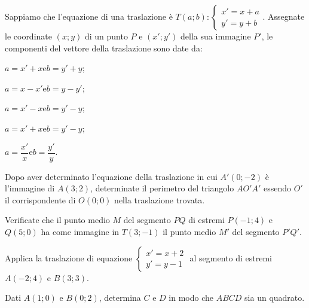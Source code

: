 \begin{esercizio}
	\label{ese:8.50} %
	Sappiamo che l'equazione di una traslazione è 
	$T(a;b):\begin{cases}x'=x+a\\y'=y+b\end{cases}$. Assegnate le 
	coordinate $(x;y)$ di un punto $P$ e $(x';y')$ della sua immagine 
	$P'$, le componenti del vettore della traslazione sono date da:
	\begin{multicols}{2}
		\begin{enumeratea}
			\item $a=x'+x$\quad e\quad $b=y'+y$;
			\item $a=x-x'$\quad e\quad $b=y-y'$;
			\item $a=x'-x$\quad e\quad $b=y'-y$;
			\item $a=x'+x$\quad e\quad $b=y'-y$;
			\item $a=\dfrac{x'}{x}$\quad e\quad $b=\dfrac{y'}{y}$.
		\end{enumeratea}
	\end{multicols}
\end{esercizio}

\begin{esercizio}
	\label{ese:8.51} %
	Dopo aver determinato l'equazione della traslazione in cui $A'(0;-2)$ 
	è l'immagine di $A(3;2)$, determinate il perimetro del triangolo 
	$AO'A'$ essendo $O'$ il corrispondente di $O(0;0)$ nella traslazione 
	trovata.
\end{esercizio}

\begin{esercizio}
	\label{ese:8.52} %
	Verificate che il punto medio $M$ del segmento $PQ$ di estremi 
	$P(-1;4)$ e $Q(5;0)$ ha come immagine in $T(3;-1)$ il punto medio 
	$M'$ del segmento $P'Q'$.
\end{esercizio}

\begin{esercizio}
	\label{ese:8.53} %
	Applica la traslazione di equazione 
	$\begin{cases}x'=x+2\\y'=y-1\end{cases}$ al segmento di estremi 
	$A(-2;4)$ e $B(3;3)$. 
\end{esercizio}

\begin{esercizio}
	\label{ese:8.54} %
	Dati $A(1;0)$ e $B(0;2)$, determina $C$ e $D$ in modo che $ABCD$ sia 
	un quadrato.
\end{esercizio}


